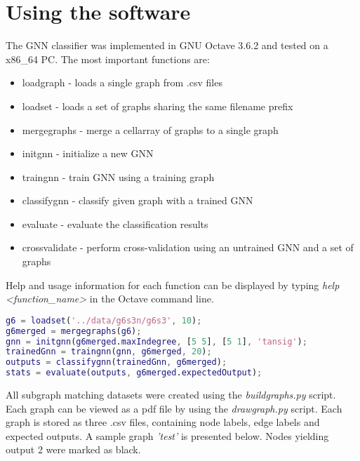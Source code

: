
\chapter{Using the software\label{chapter:using}}
\noindent The GNN classifier was implemented in GNU Octave 3.6.2 and tested on a x86\_64 PC. The most important functions are:
\begin{itemize}
	\item loadgraph - loads a single graph from .csv files
	\item loadset - loads a set of graphs sharing the same filename prefix
	\item mergegraphs - merge a cellarray of graphs to a single graph
	\item initgnn - initialize a new GNN
	\item traingnn - train GNN using a training graph
	\item classifygnn - classify given graph with a trained GNN
	\item evaluate - evaluate the classification results
	\item crossvalidate - perform cross-validation using an untrained GNN and a set of graphs
\end{itemize}
\noindent Help and usage information for each function can be displayed by typing \emph{help <function\_name>} in the Octave command line.\\



\begin{lstlisting}[style=outcode, language=Matlab, caption=Sample usage session]
g6 = loadset('../data/g6s3n/g6s3', 10);
g6merged = mergegraphs(g6);
gnn = initgnn(g6merged.maxIndegree, [5 5], [5 1], 'tansig');
trainedGnn = traingnn(gnn, g6merged, 20);
outputs = classifygnn(trainedGnn, g6merged);
stats = evaluate(outputs, g6merged.expectedOutput);
\end{lstlisting}

\noindent All subgraph matching datasets were created using the \emph{buildgraphs.py} script. Each graph can be viewed as a pdf file by using the \emph{drawgraph.py} script. Each graph is stored as three .csv files, containing node labels, edge labels and expected outputs. A sample graph \emph{'test'} is presented below. Nodes yielding output 2 were marked as black.

\begin{figure}
\begin{floatrow}
\end{floatrow}
\end{figure}
